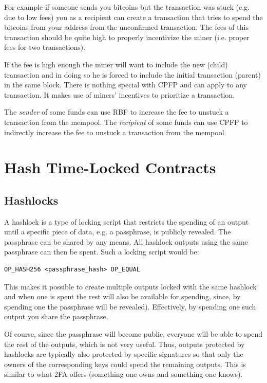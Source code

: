 For example if someone sends you bitcoins but the transaction was stuck (e.g. due to low fees) you as a recipient can create a transaction that tries to spend the bitcoins from your address from the unconfirmed transaction. The fees of this transaction should be quite high to properly incentivize the miner (i.e. proper fees for two transactions).

If the fee is high enough the miner will want to include the new (child) transaction and in doing so he is forced to include the initial transaction (parent) in the same block.
There is nothing special with CPFP and can apply to any transaction. It makes use of miners' incentives to prioritize a transaction.

\begin{note}
The \emph{sender} of some funds can use RBF to increase the fee to unstuck a transaction from the mempool. The \emph{recipient} of some funds can use CPFP to indirectly increase the fee to unstuck a transaction from the mempool.
\end{note}



\section{Hash Time-Locked Contracts}
\label{sec:htlc}

\subsection*{Hashlocks}
A hashlock is a type of locking script that restricts the spending of an output until a specific piece of data, e.g. a passphrase, is publicly revealed. The passphrase can be shared by any means. All hashlock outputs using the same passphrase can then be spent. Such a locking script would be:

\begin{emphbox}
\begin{lstlisting}[style=Pseudomath]
OP_HASH256 <passphrase_hash> OP_EQUAL
\end{lstlisting}
\end{emphbox}

This makes it possible to create multiple outputs locked with the same hashlock and when one is spent the rest will also be available for spending, since, by spending one the passphrase will be revealed). Effectively, by spending one such output you share the passphrase.

Of course, since the passphrase will become public, everyone will be able to spend the rest of the outputs, which is not very useful. Thus, outputs protected by hashlocks are typically also protected by specific signatures so that only the owners of the corresponding keys could spend the remaining outputs. This is similar to what 2FA offers (something one owns and something one knows).

